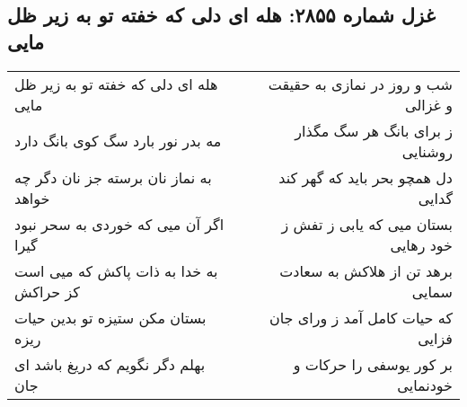 \begin{center}
\section*{غزل شماره ۲۸۵۵: هله ای دلی که خفته تو به زیر ظل مایی}
\label{sec:2855}
\begin{longtable}{l p{0.5cm} r}
هله ای دلی که خفته تو به زیر ظل مایی
&&
شب و روز در نمازی به حقیقت و غزالی
\\
مه بدر نور بارد سگ کوی بانگ دارد
&&
ز برای بانگ هر سگ مگذار روشنایی
\\
به نماز نان برسته جز نان دگر چه خواهد
&&
دل همچو بحر باید که گهر کند گدایی
\\
اگر آن میی که خوردی به سحر نبود گیرا
&&
بستان میی که یابی ز تفش ز خود رهایی
\\
به خدا به ذات پاکش که میی است کز حراکش
&&
برهد تن از هلاکش به سعادت سمایی
\\
بستان مکن ستیزه تو بدین حیات ریزه
&&
که حیات کامل آمد ز ورای جان فزایی
\\
بهلم دگر نگویم که دریغ باشد ای جان
&&
بر کور یوسفی را حرکات و خودنمایی
\\
\end{longtable}
\end{center}
